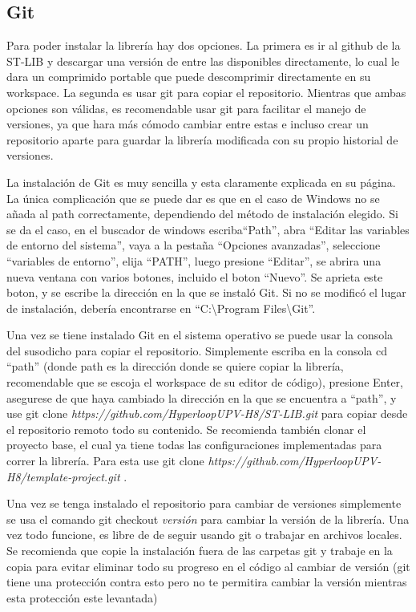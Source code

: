 \documentclass{report}
\begin{document}
\subsection{Git}
Para poder instalar la librería hay dos opciones. La primera es ir al github de la ST-LIB y descargar una versión de entre las disponibles directamente, lo cual le dara un comprimido portable que puede descomprimir directamente en su workspace. La segunda es usar git para copiar el repositorio. Mientras que ambas opciones son válidas, es recomendable usar git para facilitar el manejo de versiones, ya que hara más cómodo cambiar entre estas e incluso crear un repositorio aparte para guardar la librería modificada con su propio historial de versiones.
\par
La instalación de Git es muy sencilla\cite{web:git:installationGit} y esta claramente explicada en su página\cite{web:git:installationGitHelp}. La única complicación que se puede dar es que en el caso de Windows no se añada al path correctamente, dependiendo del método de instalación elegido. Si se da el caso, en el buscador de windows escriba``Path'', abra ``Editar las variables de entorno del sistema'', vaya a la pestaña ``Opciones avanzadas'', seleccione ``variables de entorno'', elija ``PATH'', luego presione ``Editar'', se abrira una nueva ventana con varios botones, incluido el boton ``Nuevo''. Se aprieta este boton, y se escribe la dirección en la que se instaló Git. Si no se modificó el lugar de instalación, debería encontrarse en ``C{:}{\textbackslash}Program Files{\textbackslash}Git''. 
\par \vspace{0.3 cm}
Una vez se tiene instalado Git en el sistema operativo se puede usar la consola del susodicho para copiar el repositorio. Simplemente escriba en la consola cd ``path'' (donde path es la dirección donde se quiere copiar la librería, recomendable que se escoja el workspace de su editor de código), presione Enter, asegurese de que haya cambiado la dirección en la que se encuentra a ``path'', y use git clone \textit{https://github.com/HyperloopUPV-H8/ST-LIB.git} \cite{web:github:STLIB} para copiar desde el repositorio remoto todo su contenido. Se recomienda también clonar el proyecto base, el cual ya tiene todas las configuraciones implementadas para correr la librería. Para esta use git clone \textit{https://github.com/HyperloopUPV-H8/template-project.git} \cite{web:github:templateproject}. \par \vspace{0.3 cm}
Una vez se tenga instalado el repositorio para cambiar de versiones simplemente se usa el comando git checkout \textit{versión} para cambiar la versión de la librería. Una vez todo funcione, es libre de de seguir usando git o trabajar en archivos locales. Se recomienda que copie la instalación fuera de las carpetas git y trabaje en la copia para evitar eliminar todo su progreso en el código al cambiar de versión (git tiene una protección contra esto pero no te permitira cambiar la versión mientras esta protección este levantada)\par
\end{document}
